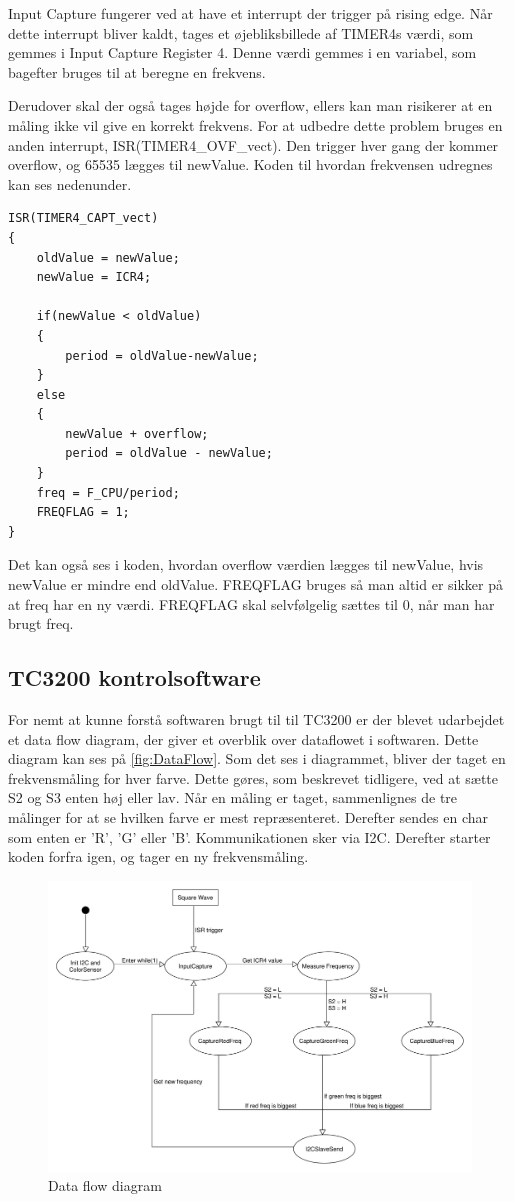 Input Capture fungerer ved at have et interrupt der trigger på rising edge. Når dette interrupt bliver kaldt, tages et øjebliksbillede af TIMER4s værdi, som gemmes i Input Capture Register 4. Denne værdi gemmes i en variabel, som bagefter bruges til at beregne en frekvens. 

Derudover skal der også tages højde for overflow, ellers kan man risikerer at en måling ikke vil give en korrekt frekvens. For at udbedre dette problem bruges en anden interrupt, ISR(TIMER4\_OVF\_vect). Den trigger hver gang der kommer overflow, og 65535 lægges til newValue. Koden til hvordan frekvensen udregnes kan ses nedenunder.

\newpage
\begin{lstlisting}
ISR(TIMER4_CAPT_vect)
{
	oldValue = newValue;
	newValue = ICR4;
	
	if(newValue < oldValue)
	{
		period = oldValue-newValue;
	}
	else
	{
		newValue + overflow;
		period = oldValue - newValue;
	}
	freq = F_CPU/period;
	FREQFLAG = 1;
}

\end{lstlisting}

Det kan også ses i koden, hvordan overflow værdien lægges til newValue, hvis newValue er mindre end oldValue. FREQFLAG bruges så man altid er sikker på at freq har en ny værdi. FREQFLAG skal selvfølgelig sættes til 0, når man har brugt freq.

\subsection{TC3200 kontrolsoftware}
For nemt at kunne forstå softwaren brugt til til TC3200 er der blevet udarbejdet et data flow diagram, der giver et overblik over dataflowet i softwaren. Dette diagram kan ses på \autoref{fig:DataFlow}. Som det ses i diagrammet, bliver der taget en frekvensmåling for hver farve. Dette gøres, som beskrevet tidligere, ved at sætte S2 og S3 enten høj eller lav. Når en måling er taget, sammenlignes de tre målinger for at se hvilken farve er mest repræsenteret. Derefter sendes en char som enten er 'R', 'G' eller 'B'. Kommunikationen sker via I2C. Derefter starter koden forfra igen, og tager en ny frekvensmåling.

\begin{figure}[H]
	\centering
	\includegraphics[width = 500pt]{Img/DataFlowDiagram.pdf}
	\caption{Data flow diagram}
	\label{fig:DataFlow}
\end{figure}
